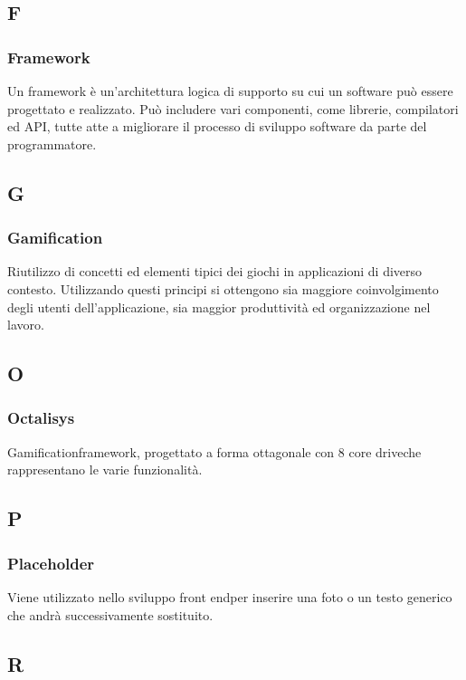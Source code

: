 \subsection*{F}
\subsubsection*{Framework}
Un framework è un'architettura logica di supporto su cui un software può essere progettato e
realizzato. Può includere vari componenti, come librerie, compilatori ed API\glo, tutte atte a
migliorare il processo di sviluppo software da parte del programmatore.

\subsection*{G}
\subsubsection*{Gamification}
Riutilizzo di concetti ed elementi tipici dei giochi in applicazioni di diverso contesto. Utilizzando
questi principi si ottengono sia maggiore coinvolgimento degli utenti dell'applicazione, sia maggior
produttività ed organizzazione nel lavoro.

\subsection*{O}
\subsubsection*{Octalisys}
Gamification\glosp framework\glo, progettato a forma ottagonale con 8 core drive\glosp che rappresentano le varie funzionalità.

\subsection*{P}
\subsubsection*{Placeholder}
Viene utilizzato nello sviluppo front end\glosp per inserire una foto o un testo generico che andrà successivamente sostituito.

\subsection*{R}
